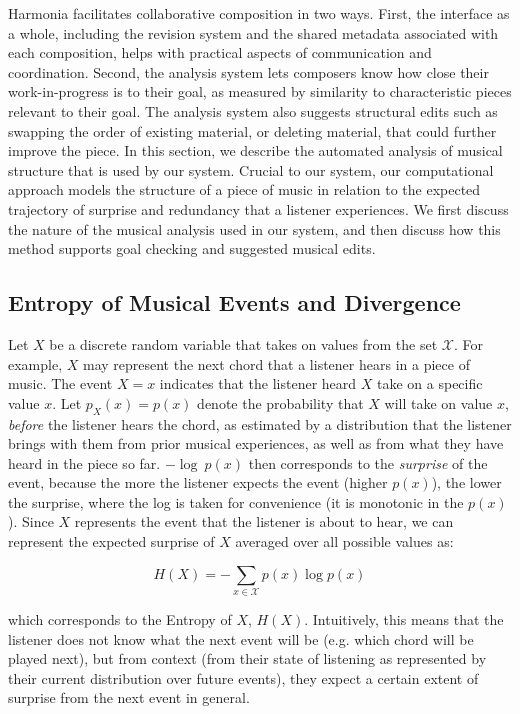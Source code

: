 \documentclass[final,authoryear,5p,times,twocolumn]{elsarticle}
\begin{document}
Harmonia facilitates collaborative composition in two ways. First, the interface as a whole, including the revision system and the shared metadata associated with each composition, helps with practical aspects of communication and coordination. Second, the analysis system lets composers know how close their work-in-progress is to their goal, as measured by similarity to characteristic pieces relevant to their goal. The analysis system also suggests structural edits such as swapping the order of existing material, or deleting material, that could further improve the piece. In this section, we describe the automated analysis of musical structure that is used by our system. Crucial to our system, our computational approach models the structure of a piece of music in relation to the expected trajectory of surprise and redundancy that a listener experiences. We first discuss the nature of the musical analysis used in our system, and then discuss how this method supports goal checking and suggested musical edits.

\subsection{Entropy of Musical Events and Divergence}
 
Let $X$ be a discrete random variable that takes on values from the set $\mathcal{X}$. For example, $X$ may represent the next chord that a listener hears in a piece of music. The event $X=x$ indicates that the listener heard $X$ take on a specific value $x$. Let $p_X(x) = p(x)$ denote the probability that $X$ will take on value $x$, \textit{before} the listener hears the chord, as estimated by a distribution that the listener brings with them from prior musical experiences, as well as from what they have heard in the piece so far. $-\log\ p(x)$ then corresponds to the \textit{surprise} of the event, because the more the listener expects the event (higher $p(x)$), the lower the surprise, where the log is taken for convenience (it is monotonic in the $p(x)$). Since $X$ represents the event that the listener is about to hear, we can represent the expected surprise of $X$ averaged over all possible values as:
 
 $$ H(X) = - \sum_{x \in \mathcal{X}} p(x) \log p(x)$$
 
\noindent which corresponds to the Entropy of $X$, $H(X)$. Intuitively, this means that the listener does not know what the next event will be (e.g. which chord will be played next), but from context (from their state of listening as represented by their current distribution over future events), they expect a certain extent of surprise from the next event in general.
\end{document}
